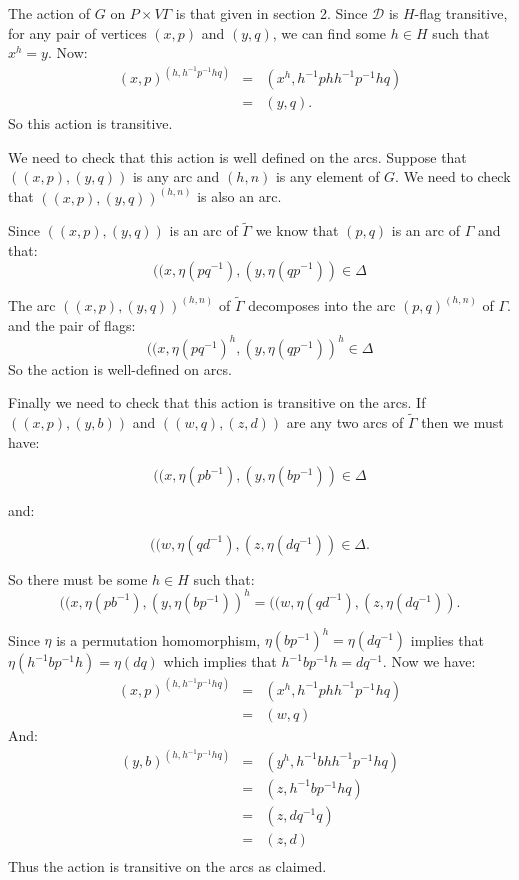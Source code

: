 \documentclass[12pt]{amsart}
\theoremstyle{plain}
\theoremstyle{definition}
\theoremstyle{remark}
\newcommand{\cD}{\mathcal{D}}
\begin{document}
The action of $G$ on $P \times V \Gamma$ is that given in section 2.
Since $\cD$ is $H$-flag transitive,
for any pair of vertices $(x,p)$ and $(y,q)$,
we can find some $h \in H$ such that $x^h = y$. 
Now: 
\begin{eqnarray*}
(x,p)^{(h,h^{-1}p^{-1}hq)} & = & (x^h, h^{-1}phh^{-1}p^{-1}hq) \\
                           & = & (y,q).
\end{eqnarray*}
So this action is transitive.
\hfill \break

We need to check that this action is well defined on the arcs.
Suppose that $((x,p),(y,q))$ is any arc and $(h,n)$ is 
any element of $G$.
We need to check that 
$((x,p),(y,q))^{(h,n)}$ is also an arc.

Since $((x,p),(y,q))$ is an arc of $\widetilde{\Gamma}$
we know that $(p,q)$ is an arc of $\Gamma$
and that: 
$$((x,\eta(pq^{-1}), (y,\eta(qp^{-1})) \in \Delta$$
\hfill \break

The arc $((x,p),(y,q))^{(h,n)}$ of $\widetilde{\Gamma}$
decomposes into the arc $(p,q)^{(h,n)}$ of $\Gamma$.
and the pair of flags: $$((x,\eta(pq^{-1})^h, (y,\eta(qp^{-1}))^h \in \Delta$$
So the action is well-defined on arcs.
\hfill \break

Finally we need to check that this action is transitive on the arcs.
If $((x,p),(y,b))$ and $((w,q),(z,d))$ are any two arcs of $\widetilde{\Gamma}$
then we must have: 

$$((x,\eta(pb^{-1}),(y,\eta(bp^{-1})) \in \Delta$$

and:  

$$((w,\eta(qd^{-1}),(z,\eta(dq^{-1})) \in \Delta.$$

\hfill \break
So there must be some $h \in H$ such that:
$$((x,\eta(pb^{-1}),(y,\eta(bp^{-1}))^h = ((w,\eta(qd^{-1}),(z,\eta(dq^{-1})).$$

\hfill \break
Since $\eta$ is a permutation homomorphism,
$\eta(bp^{-1})^h = \eta(dq^{-1})$ implies that
$\eta(h^{-1}bp^{-1}h) = \eta(dq)$ which implies that
$h^{-1}bp^{-1}h = dq^{-1}$.
Now we have: 
\begin{eqnarray*}
(x,p)^{(h,h^{-1}p^{-1}hq)} & = & (x^h, h^{-1}phh^{-1}p^{-1}hq) \\
                           & = & (w,q)
\end{eqnarray*}
And: 
\begin{eqnarray*}
(y,b)^{(h,h^{-1}p^{-1}hq)} & = & (y^h, h^{-1}bhh^{-1}p^{-1}hq) \\
                           & = & (z, h^{-1}bp^{-1}hq) \\
			   & = & (z, dq^{-1}q) \\
			   & = & (z,d) \\
\end{eqnarray*}
Thus the action is transitive on the arcs as claimed.
\end{document}
